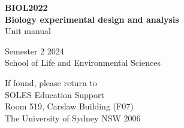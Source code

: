 %
%
%
% 


	\RaggedRight
	

	
	
	
	
	{\Huge \textbf{BIOL2022}}\\[0.5\baselineskip]
	{\fontsize{40}{48}\selectfont \textbf{Biology experimental design and analysis}}\\[0.5\baselineskip]
	{\huge Unit manual}
	
	
	
	\vspace{0.05\textheight} %
	
	
	{\Large Semester 2 2024\\[0.3\baselineskip]
	School of Life and Environmental Sciences}
	
	\vfill %
	
	
	
	\vfill

	{\normalsize If found, please return to\\
	SOLES Education Support\\
	Room 519, Carslaw Building (F07)\\
	The University of Sydney NSW 2006
	} 
	
	
	
	
	
